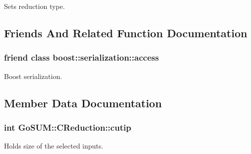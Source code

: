 Sets reduction type. 



\subsection{Friends And Related Function Documentation}
\hypertarget{class_go_s_u_m_1_1_c_reduction_ac98d07dd8f7b70e16ccb9a01abf56b9c}{
\subsubsection[{boost\-::serialization\-::access}]{\setlength{\rightskip}{0pt plus 5cm}friend class boost\-::serialization\-::access\hspace{0.3cm}{\ttfamily [friend]}}}\label{class_go_s_u_m_1_1_c_reduction_ac98d07dd8f7b70e16ccb9a01abf56b9c}


Boost serialization. 



\subsection{Member Data Documentation}
\hypertarget{class_go_s_u_m_1_1_c_reduction_a39c3a8d17c0bd32d092554277554adce}{
\subsubsection[{cutip}]{\setlength{\rightskip}{0pt plus 5cm}int Go\-S\-U\-M\-::\-C\-Reduction\-::cutip\hspace{0.3cm}{\ttfamily [private]}}}\label{class_go_s_u_m_1_1_c_reduction_a39c3a8d17c0bd32d092554277554adce}


Holds size of the selected inputs. 

